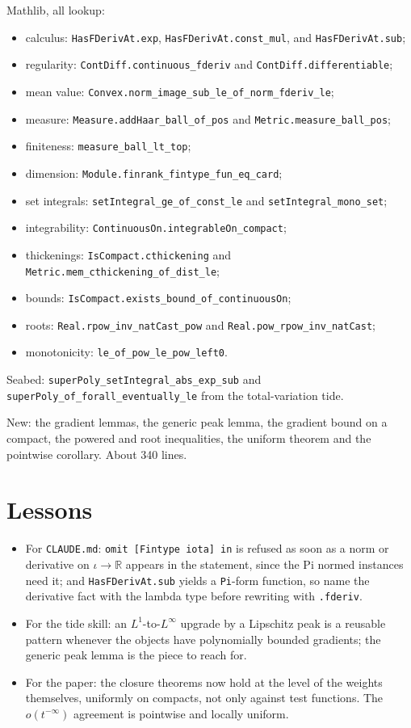 \documentclass[11pt]{article}
\newcommand{\R}{\mathbb{R}}
\newcommand{\code}[1]{\texttt{#1}}
\begin{document}
Mathlib, all lookup:
\begin{itemize}
\item calculus: \code{HasFDerivAt.exp}, \code{HasFDerivAt.const\_mul},
and \code{HasFDerivAt.sub};
\item regularity: \code{ContDiff.continuous\_fderiv} and
\code{ContDiff.differentiable};
\item mean value: \code{Convex.norm\_image\_sub\_le\_of\_norm\_fderiv\_le};
\item measure: \code{Measure.addHaar\_ball\_of\_pos} and
\code{Metric.measure\_ball\_pos};
\item finiteness: \code{measure\_ball\_lt\_top};
\item dimension: \code{Module.finrank\_fintype\_fun\_eq\_card};
\item set integrals: \code{setIntegral\_ge\_of\_const\_le} and
\code{setIntegral\_mono\_set};
\item integrability: \code{ContinuousOn.integrableOn\_compact};
\item thickenings: \code{IsCompact.cthickening} and
\code{Metric.mem\_cthickening\_of\_dist\_le};
\item bounds: \code{IsCompact.exists\_bound\_of\_continuousOn};
\item roots: \code{Real.rpow\_inv\_natCast\_pow} and
\code{Real.pow\_rpow\_inv\_natCast};
\item monotonicity: \code{le\_of\_pow\_le\_pow\_left0}.
\end{itemize}

Seabed: \code{superPoly\_setIntegral\_abs\_exp\_sub} and
\code{superPoly\_of\_forall\_eventually\_le} from the total-variation
tide.

New: the gradient lemmas, the generic peak lemma, the gradient bound on
a compact, the powered and root inequalities, the uniform theorem and
the pointwise corollary. About 340 lines.

\section{Lessons}

\begin{itemize}
\item For \code{CLAUDE.md}: \code{omit [Fintype iota] in} is refused as soon
as a norm or derivative on $\iota \to \R$ appears in the statement, since
the Pi normed instances need it; and \code{HasFDerivAt.sub} yields a
\code{Pi}-form function, so name the derivative fact with the lambda
type before rewriting with \code{.fderiv}.
\item For the tide skill: an $L^1$-to-$L^\infty$ upgrade by a Lipschitz
peak is a reusable pattern whenever the objects have polynomially
bounded gradients; the generic peak lemma is the piece to reach for.
\item For the paper: the closure theorems now hold at the level of the
weights themselves, uniformly on compacts, not only against test
functions. The $o(t^{-\infty})$ agreement is pointwise and locally
uniform.
\end{itemize}
\end{document}
